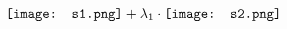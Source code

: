 \documentclass{article}
\newcommand{\myfancysymbol}{
	{\mathchoice
	{\texttt{[image: s1.png]}}
	{\texttt{[image: s1.png]}}
	{\texttt{[image: s1.png]}}
	{\texttt{[image: s1.png]}}
	}
}
\begin{document}
$$
\myfancysymbol + \lambda_1\cdot \texttt{[image: s2.png]}
$$
\end{document}
